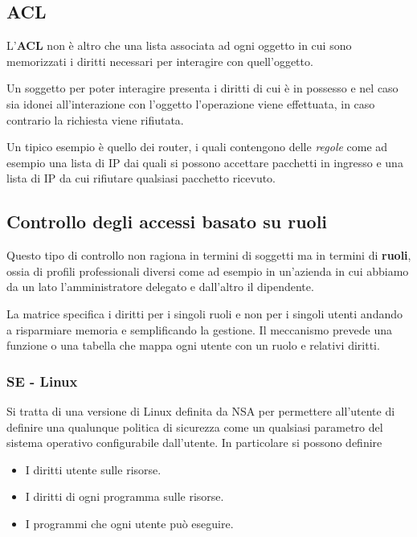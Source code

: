 \subsection{ACL}
L'\textbf{ACL} non è altro che una lista associata ad ogni oggetto in cui sono memorizzati i diritti necessari per
interagire con quell'oggetto.

Un soggetto per poter interagire presenta i diritti di cui è in possesso e nel caso sia idonei all'interazione con
l'oggetto l'operazione viene effettuata, in caso contrario la richiesta viene rifiutata.

Un tipico esempio è quello dei router, i quali contengono delle \emph{regole} come ad esempio una lista di IP dai
quali si possono accettare pacchetti in ingresso e una lista di IP da cui rifiutare qualsiasi pacchetto ricevuto.

\subsection{Controllo degli accessi basato su ruoli}
Questo tipo di controllo non ragiona in termini di soggetti ma in termini di \textbf{ruoli}, ossia di profili
professionali diversi come ad esempio in un'azienda in cui abbiamo da un lato l'amministratore delegato e dall'altro
il dipendente.

La matrice specifica i diritti per i singoli ruoli e non per i singoli utenti andando a risparmiare memoria e
semplificando la gestione. Il meccanismo prevede una funzione o una tabella che mappa ogni utente con un ruolo e
relativi diritti.

\subsubsection{SE - Linux}
Si tratta di una versione di Linux definita da NSA per permettere all'utente di definire una qualunque politica di
sicurezza come un qualsiasi parametro del sistema operativo configurabile dall'utente. In particolare si possono
definire
\begin{itemize}
	\item I diritti utente sulle risorse.
	\item I diritti di ogni programma sulle risorse.
	\item I programmi che ogni utente può eseguire.
\end{itemize}
